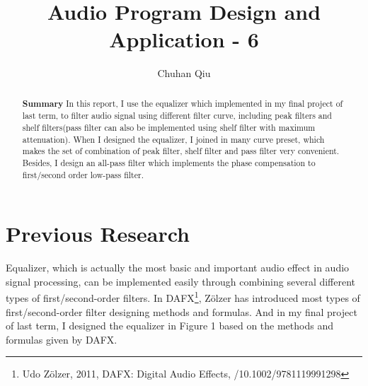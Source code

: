 \documentclass[a4paper]{tufte-handout} %
\title{Audio Program Design and Application - 6}
\author{Chuhan Qiu}
\begin{document}
\maketitle %


\begin{abstract}
	\textbf{Summary}
In this report, I use the equalizer which implemented in my final project of last term,
to filter audio signal using different filter curve, including peak filters and shelf filters(pass filter can also be implemented using shelf filter with maximum attenuation).
When I designed the equalizer, I joined in many curve preset, which makes the set of combination of peak filter, shelf filter and pass filter very convenient.
Besides, I design an all-pass filter which implements the phase compensation to first/second order low-pass filter.
\end{abstract}


\section{Previous Research}
Equalizer, which is actually the most basic and important audio effect in audio signal processing, can be implemented easily through combining several different types of first/second-order filters. In DAFX\footnote{Udo Zölzer, 2011, DAFX: Digital Audio Effects, /10.1002/9781119991298}, Zölzer has introduced most types of first/second-order filter designing methods and formulas. And in my final project of last term, I designed the equalizer in Figure 1 based on the methods and formulas given by DAFX.
\end{document}
